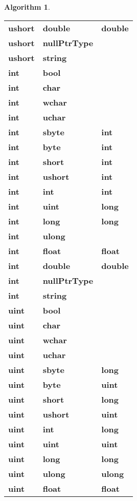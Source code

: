 \documentclass[a4paper,oneside,11pt]{book}
\theoremstyle{definition}
\newtheorem{algo}{Algorithm}[section]
\begin{document}
\begin{algo}
\begin{flushleft}
\begin{supertabular}{lll}
\textbf{ushort}& \textbf{double}& \textbf{double}\\
\textbf{ushort}& \textbf{nullPtrType}& \\
\textbf{ushort}& \textbf{string}& \\
\hline
\textbf{int}& \textbf{bool}& \\
\textbf{int}& \textbf{char}& \\
\textbf{int}& \textbf{wchar}& \\
\textbf{int}& \textbf{uchar}& \\
\textbf{int}& \textbf{sbyte}& \textbf{int}\\
\textbf{int}& \textbf{byte}& \textbf{int}\\
\textbf{int}& \textbf{short}& \textbf{int}\\
\textbf{int}& \textbf{ushort}& \textbf{int}\\
\textbf{int}& \textbf{int}& \textbf{int}\\
\textbf{int}& \textbf{uint}& \textbf{long}\\
\textbf{int}& \textbf{long}& \textbf{long}\\
\textbf{int}& \textbf{ulong}& \\
\textbf{int}& \textbf{float}& \textbf{float}\\
\textbf{int}& \textbf{double}& \textbf{double}\\
\textbf{int}& \textbf{nullPtrType}& \\
\textbf{int}& \textbf{string}& \\
\hline
\textbf{uint}& \textbf{bool}& \\
\textbf{uint}& \textbf{char}& \\
\textbf{uint}& \textbf{wchar}& \\
\textbf{uint}& \textbf{uchar}& \\
\textbf{uint}& \textbf{sbyte}& \textbf{long}\\
\textbf{uint}& \textbf{byte}& \textbf{uint}\\
\textbf{uint}& \textbf{short}& \textbf{long}\\
\textbf{uint}& \textbf{ushort}& \textbf{uint}\\
\textbf{uint}& \textbf{int}& \textbf{long}\\
\textbf{uint}& \textbf{uint}& \textbf{uint}\\
\textbf{uint}& \textbf{long}& \textbf{long}\\
\textbf{uint}& \textbf{ulong}& \textbf{ulong}\\
\textbf{uint}& \textbf{float}& \textbf{float}\\

\end{supertabular}
\end{flushleft}
\end{algo}
\end{document}
